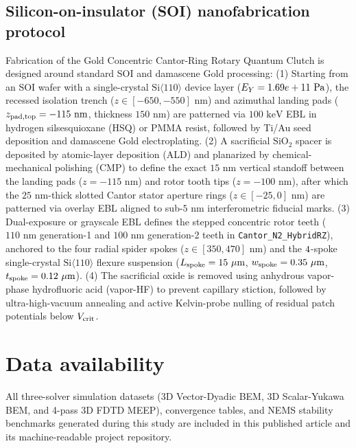 \documentclass[11pt,letterpaper]{article}
\begin{document}
\subsection*{Silicon-on-insulator (SOI) nanofabrication protocol}
Fabrication of the Gold Concentric Cantor-Ring Rotary Quantum Clutch is designed around standard SOI and damascene Gold processing: (1) Starting from an SOI wafer with a single-crystal $\text{Si}\langle 110\rangle$ device layer ($E_Y = 1.69e+11{}\text{ Pa}$), the recessed isolation trench ($z \in [-650, -550]\text{ nm}$) and azimuthal landing pads ($z_{\rm pad,top} = -115\text{ nm}$, thickness $150\text{ nm}$) are patterned via $100\text{ keV}$ EBL in hydrogen silsesquioxane (HSQ) or PMMA resist, followed by Ti/Au seed deposition and damascene Gold electroplating. (2) A sacrificial $\text{SiO}_2$ spacer is deposited by atomic-layer deposition (ALD) and planarized by chemical-mechanical polishing (CMP) to define the exact $15\text{ nm}$ vertical standoff between the landing pads ($z = -115\text{ nm}$) and rotor tooth tips ($z = -100\text{ nm}$), after which the $25\text{ nm}$-thick slotted Cantor stator aperture rings ($z \in [-25, 0]\text{ nm}$) are patterned via overlay EBL aligned to sub-$5\text{ nm}$ interferometric fiducial marks. (3) Dual-exposure or grayscale EBL defines the stepped concentric rotor teeth ($110\text{ nm}$ generation-1 and $100\text{ nm}$ generation-2 teeth in \texttt{Cantor\_N2\_HybridRZ}), anchored to the four radial spider spokes ($z \in [350, 470]\text{ nm}$) and the $4{}$-spoke single-crystal $\text{Si}\langle 110\rangle$ flexure suspension ($L_{\rm spoke} = \NatureRotCeightCompactNtwoLateralStabilityLSpokeUm{}\ \mu\text{m}$, $w_{\rm spoke} = \NatureRotCeightCompactNtwoLateralStabilityWSpokeUm{}\ \mu\text{m}$, $t_{\rm spoke} = \NatureRotCeightCompactNtwoLateralStabilityTSpokeUm{}\ \mu\text{m}$). (4) The sacrificial oxide is removed using anhydrous vapor-phase hydrofluoric acid (vapor-HF) to prevent capillary stiction, followed by ultra-high-vacuum annealing and active Kelvin-probe nulling of residual patch potentials below $V_{\rm crit}$.

\section*{Data availability}
All three-solver simulation datasets (3D Vector-Dyadic BEM, 3D Scalar-Yukawa BEM, and 4-pass 3D FDTD MEEP), convergence tables, and NEMS stability benchmarks generated during this study are included in this published article and its machine-readable project repository.
\end{document}
